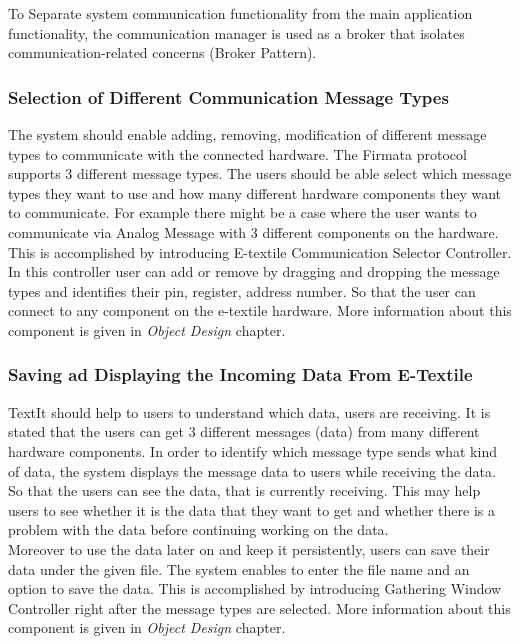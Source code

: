 	To Separate system communication functionality from the main application functionality, the communication manager is used as a broker that isolates communication-related concerns (Broker Pattern).
	
	\subsubsection{Selection of Different Communication Message Types} 
The system should enable adding, removing, modification of different message types to communicate with the connected hardware. The Firmata protocol supports 3 different message types. The users should be able select which message types they want to use and how many different hardware components they want to communicate. For example there might be a case where the user wants to communicate via Analog Message with 3 different components on the hardware. This is accomplished by introducing E-textile Communication Selector Controller. In this controller user can add or remove by dragging and dropping the message types and identifies their pin, register, address number. So that the user can connect to any component on the e-textile hardware. More information about this component is given in \textit{Object Design} chapter.
	
	\subsubsection{Saving ad Displaying the Incoming Data From E-Textile} 
	TextIt should help to users to understand which data, users are receiving. It is stated that the users can get 3 different messages (data) from many different hardware components. In order to identify which message type sends what kind of data, the system displays the message data to users while receiving the data. So that the users can see the data, that is currently receiving. This may help users to see whether it is the data that they want to get and whether there is a problem with the data before continuing working on the data. \\
	
	Moreover to use the data later on and keep it persistently, users can save their data under the given file. The system enables to enter the file name and an option to save the data. This is accomplished by introducing Gathering Window Controller right after the message types are selected. More information about this component is given in \textit{Object Design} chapter.
	
